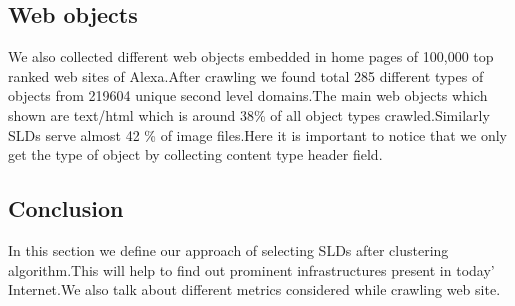 \subsection{Web objects}
We also collected different web objects embedded in home pages of 100,000 top ranked web sites of Alexa.After crawling we found total 285 different types of objects from 219604 unique second level domains.The main web objects which shown are text/html which is around 38\% of all object types crawled.Similarly SLDs serve almost 42 \% of image files.Here it is important to notice that we only get the type of object by collecting content type header field.

\subsection{Conclusion}
In this section we define our approach of selecting SLDs after clustering algorithm.This will help to find out prominent infrastructures present in today' Internet.We also talk about different metrics considered while crawling web site.